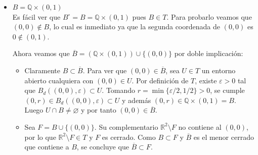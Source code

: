 \documentclass[12pt]{article}
\begin{document}
\begin{ejercicio}
\begin{enumerate}
\begin{itemize}
\begin{figure}[h!]
        \caption{Representación de $A = \mathbb{Q} \times \{0\}$ y sus entornos críticos.}
        \end{figure}

        \item $B = \mathbb{Q} \times (0,1)$\\
        Es fácil ver que $B^{\circ} = B = \mathbb{Q} \times (0,1)$ pues $B\in T$. Para probarlo veamos que $(0,0)\notin B$, lo cual es inmediato ya que la segunda coordenada de $(0,0)$ es $0 \notin (0,1)$.

        Ahora veamos que $\overline{B} = (\mathbb{Q} \times (0,1)) \cup \{(0,0)\}$ por doble implicación:
        \begin{itemize}
            \item[$\supseteq$] Claramente $B \subset \overline{B}$. Para ver que $(0,0) \in \overline{B}$, sea $U \in T$ un entorno abierto cualquiera con $(0,0) \in U$. Por definición de $T$, existe $\varepsilon > 0$ tal que $B_d((0,0), \varepsilon) \subset U$. Tomando $r = \min\{\varepsilon/2, 1/2\} > 0$, se cumple $(0, r) \in B_d((0,0), \varepsilon) \subset U$ y además $(0, r) \in \mathbb{Q} \times (0,1) = B$. Luego $U \cap B \neq \varnothing$ y por tanto $(0,0) \in \overline{B}$.
            \item[$\subseteq$] Sea $F = B \cup \{(0,0)\}$. Su complementario $\mathbb{R}^2 \setminus F$ no contiene al $(0,0)$, por lo que $\mathbb{R}^2 \setminus F \in T$ y $F$ es cerrado. Como $B \subset F$ y $\overline{B}$ es el menor cerrado que contiene a $B$, se concluye que $\overline{B} \subset F$.
        \end{itemize}
        \end{itemize}

        \begin{figure}[h!]
        \centering
\end{figure}
\end{enumerate}
\end{ejercicio}
\end{document}
